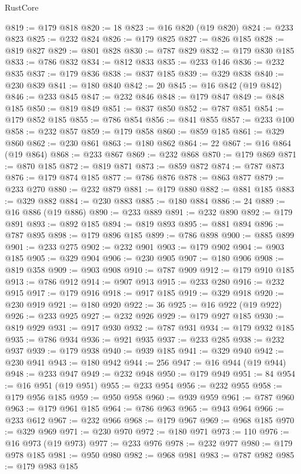 \begin{lexlean}{RustCore}
\begin{coremodule}
@819 := @179 @818
@820 := 18
@823 := @16 @820 (@19 @820)
@824 := @233 @823
@825 := @232 @824
@826 := @179 @825
@827 := @826 @185
@828 := @819 @827
@829 := @801 @828
@830 := @787 @829
@832 := @179 @830 @185
@833 := @786 @832
@834 := @812 @833
@835 := @233 @146
@836 := @232 @835
@837 := @179 @836
@838 := @837 @185
@839 := @329 @838
@840 := @230 @839
@841 := @180 @840
@842 := 20
@845 := @16 @842 (@19 @842)
@846 := @233 @845
@847 := @232 @846
@848 := @179 @847
@849 := @848 @185
@850 := @819 @849
@851 := @837 @850
@852 := @787 @851
@854 := @179 @852 @185
@855 := @786 @854
@856 := @841 @855
@857 := @233 @100
@858 := @232 @857
@859 := @179 @858
@860 := @859 @185
@861 := @329 @860
@862 := @230 @861
@863 := @180 @862
@864 := 22
@867 := @16 @864 (@19 @864)
@868 := @233 @867
@869 := @232 @868
@870 := @179 @869
@871 := @870 @185
@872 := @819 @871
@873 := @859 @872
@874 := @787 @873
@876 := @179 @874 @185
@877 := @786 @876
@878 := @863 @877
@879 := @233 @270
@880 := @232 @879
@881 := @179 @880
@882 := @881 @185
@883 := @329 @882
@884 := @230 @883
@885 := @180 @884
@886 := 24
@889 := @16 @886 (@19 @886)
@890 := @233 @889
@891 := @232 @890
@892 := @179 @891
@893 := @892 @185
@894 := @819 @893
@895 := @881 @894
@896 := @787 @895
@898 := @179 @896 @185
@899 := @786 @898
@900 := @885 @899
@901 := @233 @275
@902 := @232 @901
@903 := @179 @902
@904 := @903 @185
@905 := @329 @904
@906 := @230 @905
@907 := @180 @906
@908 := @819 @358
@909 := @903 @908
@910 := @787 @909
@912 := @179 @910 @185
@913 := @786 @912
@914 := @907 @913
@915 := @233 @280
@916 := @232 @915
@917 := @179 @916
@918 := @917 @185
@919 := @329 @918
@920 := @230 @919
@921 := @180 @920
@922 := 36
@925 := @16 @922 (@19 @922)
@926 := @233 @925
@927 := @232 @926
@929 := @179 @927 @185
@930 := @819 @929
@931 := @917 @930
@932 := @787 @931
@934 := @179 @932 @185
@935 := @786 @934
@936 := @921 @935
@937 := @233 @285
@938 := @232 @937
@939 := @179 @938
@940 := @939 @185
@941 := @329 @940
@942 := @230 @941
@943 := @180 @942
@944 := 256
@947 := @16 @944 (@19 @944)
@948 := @233 @947
@949 := @232 @948
@950 := @179 @949
@951 := 84
@954 := @16 @951 (@19 @951)
@955 := @233 @954
@956 := @232 @955
@958 := @179 @956 @185
@959 := @950 @958
@960 := @939 @959
@961 := @787 @960
@963 := @179 @961 @185
@964 := @786 @963
@965 := @943 @964
@966 := @233 @612
@967 := @232 @966
@968 := @179 @967
@969 := @968 @185
@970 := @329 @969
@971 := @230 @970
@972 := @180 @971
@973 := 110
@976 := @16 @973 (@19 @973)
@977 := @233 @976
@978 := @232 @977
@980 := @179 @978 @185
@981 := @950 @980
@982 := @968 @981
@983 := @787 @982
@985 := @179 @983 @185

\end{coremodule}
\end{lexlean}
